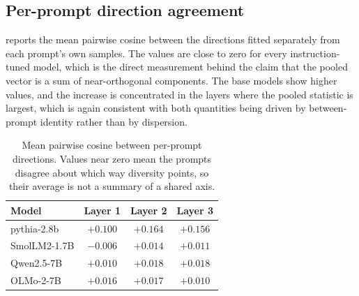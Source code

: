 \subsection{Per-prompt direction agreement}

 reports the mean pairwise cosine between the directions fitted separately from
each prompt's own samples. The values are close to zero for every instruction-tuned model, which is
the direct measurement behind the claim that the pooled vector is a sum of near-orthogonal
components. The base models show higher values, and the increase is concentrated in the layers where
the pooled statistic is largest, which is again consistent with both quantities being driven by
between-prompt identity rather than by dispersion.

\begin{table}[t]
\centering
\small
\begin{tabular}{lccc}
\toprule
Model & Layer 1 & Layer 2 & Layer 3 \\
\midrule
pythia-2.8b   & $+0.100$ & $+0.164$ & $+0.156$ \\
SmolLM2-1.7B  & $-0.006$ & $+0.014$ & $+0.011$ \\
Qwen2.5-7B    & $+0.010$ & $+0.018$ & $+0.018$ \\
OLMo-2-7B     & $+0.016$ & $+0.017$ & $+0.010$ \\
\bottomrule
\end{tabular}
\caption{Mean pairwise cosine between per-prompt directions. Values near zero mean the prompts
disagree about which way diversity points, so their average is not a summary of a shared axis.}
\label{tab:consistency}
\end{table}

